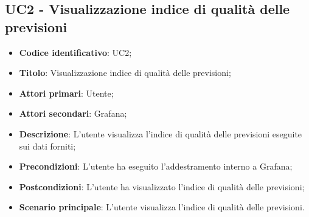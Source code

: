 \subsection{UC2 - Visualizzazione indice di qualità delle previsioni}
\begin{itemize}
	\item \textbf{Codice identificativo}: UC2;
	\item \textbf{Titolo}: Visualizzazione indice di qualità delle previsioni;
	\item \textbf{Attori primari}: Utente;
	\item \textbf{Attori secondari}: Grafana\glo;
	\item \textbf{Descrizione}: L'utente visualizza l'indice di qualità delle previsioni eseguite sui dati forniti;
	\item \textbf{Precondizioni}: L'utente ha eseguito l'addestramento interno a Grafana;
	\item \textbf{Postcondizioni}: L'utente ha visualizzato l'indice di qualità delle previsioni;
	\item \textbf{Scenario principale}: L'utente visualizza l'indice di qualità delle previsioni.
\end{itemize}